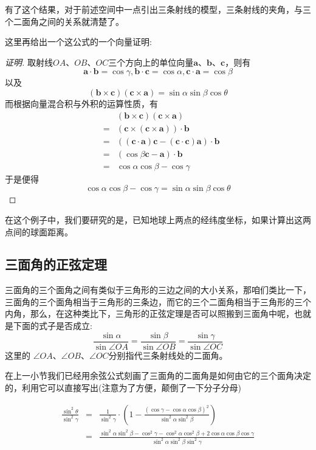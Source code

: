 有了这个结果，对于前述空间中一点引出三条射线的模型，三条射线的夹角，与三个二面角之间的关系就清楚了。

这里再给出一个这公式的一个向量证明:
\begin{proof}[证明]
  取射线$OA$、$OB$、$OC$三个方向上的单位向量$\bm a$、$\bm b$、$\bm c$，则有
  \[ \bm a\cdot \bm b=\cos{\gamma}, \bm b \cdot \bm c = \cos{\alpha}, \bm c \cdot \bm a = \cos{\beta} \]
  以及
  \[ (\bm b\times \bm c)(\bm c \times \bm a) = \sin{\alpha}\sin{\beta}\cos{\theta} \]
  而根据向量混合积与外积的运算性质，有
  \begin{eqnarray*}
    && (\bm b\times \bm c)(\bm c \times \bm a) \\
    & = & (\bm c \times (\bm c \times \bm a)) \cdot \bm b \\
    & = & ((\bm c \cdot \bm a) \bm c - ( \bm c \cdot \bm c) \bm a) \cdot \bm b \\
    & = & (\cos{\beta} \bm c - \bm a) \cdot \bm b \\
    & = & \cos{\alpha}\cos{\beta}-\cos{\gamma}
  \end{eqnarray*}
  于是便得
  \[ \cos{\alpha}\cos{\beta}-\cos{\gamma} = \sin{\alpha}\sin{\beta}\cos{\theta} \]
\end{proof}

\begin{example}[根据经纬度计算地球上两点间的(球面)距离]
  在这个例子中，我们要研究的是，已知地球上两点的经纬度坐标，如果计算出这两点间的球面距离。
\end{example}

\subsection{三面角的正弦定理}
\label{sec:sine-thoream-of-trihedral-angle}

三面角的三个面角之间有类似于三角形的三边之间的大小关系，那咱们类比一下，三面角的三个面角相当于三角形的三条边，而它的三个二面角相当于三角形的三个内角，那么，在这种类比下，三角形的正弦定理是否可以照搬到三面角中呢，也就是下面的式子是否成立:
\[ \frac{\sin{\alpha}}{\sin{\angle OA}} = \frac{\sin{\beta}}{\sin{\angle OB}} = \frac{\sin{\gamma}}{\sin{\angle OC}} \]
这里的 $\angle OA$、$\angle OB$、$\angle OC$分别指代三条射线处的二面角。

在上一小节我们已经用余弦公式刻画了三面角的二面角是如何由它的三个面角决定的，利用它可以直接写出(注意为了方便，颠倒了一下分子分母)

\begin{eqnarray*}
  \frac{\sin^{2}{\theta}}{\sin^2{\gamma}} & = & \frac{1}{\sin^2{\gamma}} \cdot \left( 1-\frac{(\cos{\gamma}-\cos{\alpha}\cos{\beta})^2}{\sin^2{\alpha}\sin^2{\beta}} \right) \\
  & = & \frac{\sin^2{\alpha}\sin^2{\beta}-\cos^2{\gamma}-\cos^2{\alpha}\cos^2{\beta}+2\cos{\alpha}\cos{\beta}\cos{\gamma}}{\sin^2{\alpha}\sin^2{\beta}\sin^2{\gamma}} 
\end{eqnarray*}

